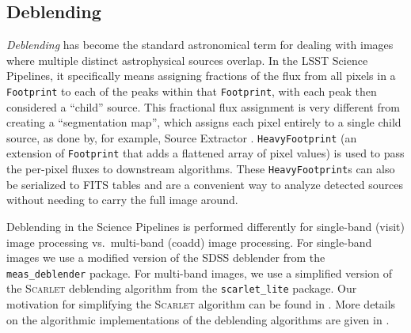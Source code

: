 \subsection{Deblending}

\label{sec:deblending}

\emph{Deblending} has become the standard astronomical term for dealing with images where multiple distinct astrophysical sources overlap.
In the LSST Science Pipelines, it specifically means assigning fractions of the flux from all pixels in a \texttt{Footprint} to each of the peaks within that \texttt{Footprint}, with each peak then considered a ``child'' source.
This fractional flux assignment is very different from creating a ``segmentation map'', which assigns each pixel entirely to a single child source, as done by, for example, Source Extractor \citep{1996A&AS..117..393B}.
\texttt{HeavyFootprint} (an extension of \texttt{Footprint} that adds a flattened array of pixel values) is used to pass the per-pixel fluxes to downstream algorithms.
These \texttt{HeavyFootprint}s can also be serialized to FITS tables and are a convenient way to analyze detected sources without needing to carry the full image around.

Deblending in the Science Pipelines is performed differently for single-band (visit) image processing vs.\ multi-band (coadd) image processing.
For single-band images we use a modified version of the SDSS deblender \citep{rhldeblend} from the \texttt{meas\_deblender} package.
For multi-band images, we use a simplified version of the \textsc{Scarlet} deblending algorithm \citep{2018A&C....24..129M} from the \texttt{scarlet\_lite} package.
Our motivation for simplifying the \textsc{Scarlet} algorithm can be found in \citet{DMTN-194}.
More details on the algorithmic implementations of the deblending algorithms are given in .
